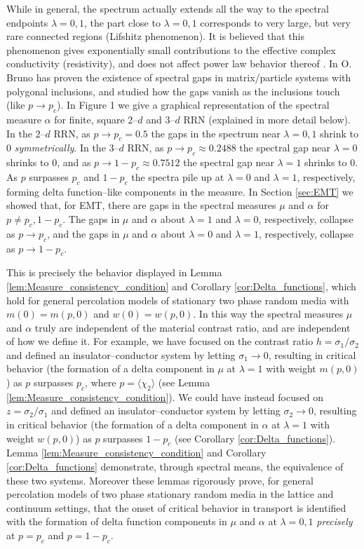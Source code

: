 \documentclass[english,12pt,jmp,graphicx]{revtex4-1}
\begin{document}
While in general, the spectrum actually extends all the way to the
spectral endpoints $\lambda=0,1$, the part close to $\lambda=0,1$ corresponds to
very large, but very rare connected regions (Lifshitz phenomenon). It
is believed that this phenomenon gives exponentially small
contributions to the effective complex conductivity (resistivity), and
does not affect power law behavior thereof \cite{Golden:PRL-3935}. 
In \cite{Bruno:PRSLA-353} O. Bruno has proven the existence of
spectral gaps in matrix/particle systems with polygonal inclusions,
and studied how the gaps vanish as the inclusions touch (like
$p\to p_c$). In Figure 1 we give a graphical
representation of the spectral measure $\alpha$ for finite, square 2--$d$ and
3--$d$ RRN \cite{Golden:JoB:337} (explained in more detail below). In
the 2--$d$ RRN, as $p\to p_c=0.5$ the 
gaps in the spectrum near $\lambda=0,1$ shrink to 0 \emph{symmetrically}. In
the 3--$d$ RRN, as $p\to p_c\approx0.2488$ the spectral gap near $\lambda=0$ shrinks to
0, and as $p\to1-p_c\approx0.7512$ the spectral gap near $\lambda=1$ shrinks to 0.
As $p$ surpasses $p_c$ and $1-p_c$ the spectra pile up at $\lambda=0$ and
$\lambda=1$, respectively, forming delta function--like components in the
measure. In Section \ref{sec:EMT} we showed that, for EMT, there are
gaps in the spectral measures $\mu$ and $\alpha$ for $p\neq p_c,1-p_c$. The gaps
in $\mu$ and $\alpha$ about $\lambda=1$ and $\lambda=0$, respectively, collapse as
$p\to p_c$, and the gaps in $\mu$ and $\alpha$ about $\lambda=0$ and $\lambda=1$,
respectively, collapse as $p\to1-p_c$.

This is precisely the behavior displayed in  Lemma
\ref{lem:Measure_consistency_condition} and Corollary
\ref{cor:Delta_functions}, which hold for general percolation models of
stationary two phase random media with $m(0)=m(p,0)$ and
$w(0)=w(p,0)$. In this way the spectral measures $\mu$ and $\alpha$ truly are
independent of the material contrast ratio, and are independent of how
we define it. For example, we have focused on the contrast ratio
$h=\sigma_1/\sigma_2$ and defined an insulator--conductor system by letting
$\sigma_1\to0$, resulting in critical behavior (the formation of a delta
component in $\mu$ at $\lambda=1$ with weight $m(p,0)$) as $p$ surpasses
$p_c$, where $p=\langle\chi_2\rangle$ (see Lemma
\ref{lem:Measure_consistency_condition}). We could have instead 
focused on $z=\sigma_2/\sigma_1$ and defined an insulator--conductor system by
letting $\sigma_2\to0$, resulting in critical behavior (the formation of a
delta component in $\alpha$ at $\lambda=1$ with weight $w(p,0)$) as $p$ surpasses
$1-p_c$ (see Corollary \ref{cor:Delta_functions}). Lemma
\ref{lem:Measure_consistency_condition} and Corollary
\ref{cor:Delta_functions} demonstrate, through spectral means, the
equivalence of these two systems. Moreover these lemmas rigorously
prove, for general percolation models of two phase stationary random
media in the lattice and continuum settings, that the onset of
critical behavior in transport is identified with the formation of
delta function components in $\mu$ and $\alpha$ at $\lambda=0,1$ \emph{precisely}
at $p=p_c$ and $p=1-p_c$. 
 
\end{document}
